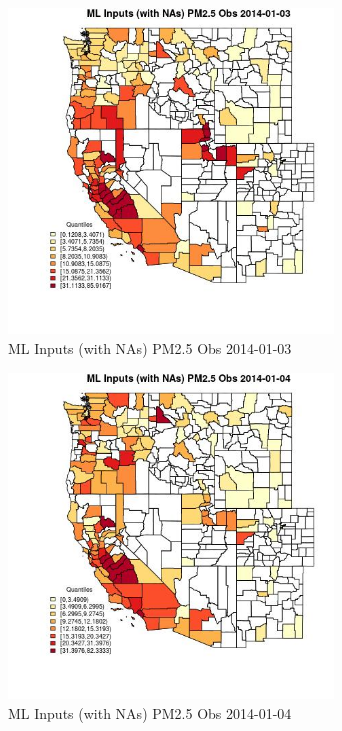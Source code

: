 \begin{figure} 
\centering  
\includegraphics[width=0.77\textwidth]{Code_Outputs/Report_ML_input_PM25_Step4_part_e_de_duplicated_aveswNAs_CountyPM25_ObsMean2014-01-03_2014-01-03.jpg} 
\caption{\label{fig:Report_ML_input_PM25_Step4_part_e_de_duplicated_aveswNAsCountyPM25_ObsMean2014-01-03_2014-01-03}ML Inputs (with NAs) PM2.5 Obs 2014-01-03} 
\end{figure} 
 

\begin{figure} 
\centering  
\includegraphics[width=0.77\textwidth]{Code_Outputs/Report_ML_input_PM25_Step4_part_e_de_duplicated_aveswNAs_CountyPM25_ObsMean2014-01-04_2014-01-04.jpg} 
\caption{\label{fig:Report_ML_input_PM25_Step4_part_e_de_duplicated_aveswNAsCountyPM25_ObsMean2014-01-04_2014-01-04}ML Inputs (with NAs) PM2.5 Obs 2014-01-04} 
\end{figure} 
 

